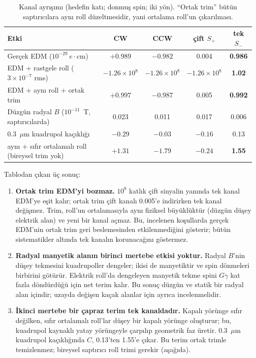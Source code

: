 \documentclass[12pt,a4paper]{extarticle}
\begin{document}
\begin{table}[H]\centering\small
\footnotesize\caption{Kanal ayrışımı (hedefin katı; donmuş spin; iki yön). ``Ortak trim'' bütün saptırıcılara aynı roll
düzeltmesidir, yani ortalama roll'un çıkarılması.}\label{tab:kanal}
\begin{tabular}{lcccc}\toprule
Etki & CW & CCW & çift $S_+$ & tek $S_-$\\\midrule
Gerçek EDM ($10^{-29}~e\cdot$cm) & $+0.989$ & $-0.982$ & 0.004 & \textbf{0.986}\\
EDM + rastgele roll ($3\times10^{-7}$ rms) & $-1.26\times10^8$ & $-1.26\times10^8$ & $-1.26\times10^8$ & \textbf{1.02}\\
EDM + aynı roll + ortak trim & $+0.997$ & $-0.987$ & 0.005 & \textbf{0.992}\\
Düzgün radyal $B$ ($10^{-11}$~T, saptırıcılarda) & 0.023 & 0.011 & 0.017 & 0.006\\
0.3~$\mu$m kuadrupol kaçıklığı & $-0.29$ & $-0.03$ & $-0.16$ & 0.13\\
aynı + sıfır ortalamalı roll (bireysel trim yok) & $+1.31$ & $-1.79$ & $-0.24$ & \textbf{1.55}\\\bottomrule
\end{tabular}
\end{table}

Tablodan çıkan üç sonuç:
\begin{enumerate}
\item \textbf{Ortak trim EDM'yi bozmaz.} $10^8$ katlık çift sinyalin yanında tek kanal EDM'ye eşit kalır; ortak
trim çift kanalı 0.005'e indirirken tek kanal değişmez. Trim, roll'un ortalamasıyla aynı fiziksel büyüklüktür
(düzgün düşey elektrik alan) ve yeni bir kanal açmaz. Bu, incelenen koşullarda gerçek EDM'nin ortak trim geri
beslemesinden etkilenmediğini gösterir; bütün sistematikler altında tek kanalın korunacağını göstermez.
\item \textbf{Radyal manyetik alanın birinci mertebe etkisi yoktur.} Radyal $B$'nin düşey tekmesini kuadrupoller
dengeler; ikisi de manyetiktir ve spin dönmeleri birbirini götürür. Elektrik roll'da dengeleyen manyetik tekme
spini $G\gamma$ kat fazla döndürdüğü için net terim kalır. Bu sonuç düzgün ve statik bir radyal alan içindir;
uzayda değişen kaçak alanlar için ayrıca incelenmelidir.
\item \textbf{İkinci mertebe bir çapraz terim tek kanaldadır.} Kapalı yörünge sıfır değilken, sıfır ortalamalı
roll'lar düşey bir kapalı yörünge oluşturur; bu, kuadrupol kaynaklı yatay yörüngeyle çarpılıp geometrik faz
üretir. 0.3~$\mu$m kuadrupol kaçıklığında $C$, 0.13'ten 1.55'e çıkar. Bu terim ortak trimle temizlenmez; bireysel
saptırıcı roll trimi gerekir (aşağıda).
\end{enumerate}
\end{document}
